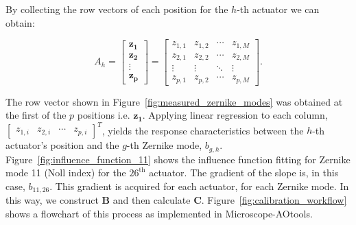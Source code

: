 By collecting the row vectors of each position
for the $h$-th actuator we can obtain:

\begin{equation}\label{eq:zernike_amp_actuator}
A_h = 
\begin{bmatrix}
\boldsymbol{z_{1}}\\
\boldsymbol{z_{2}}\\
\vdots\\
\boldsymbol{z_{p}} 
\end{bmatrix}
=
\begin{bmatrix}
z_{1,1} & z_{1,2} & \cdots & z_{1,M} \\
z_{2,1} & z_{2,2} & \cdots & z_{2,M} \\
\vdots  & \vdots  & \ddots & \vdots  \\
z_{p,1} & z_{p,2} & \cdots & z_{p,M} 
\end{bmatrix}.
\end{equation}

The row vector shown in Figure~\ref{fig:measured_zernike_modes} was 
obtained at the first of the $p$ positions i.e. $\boldsymbol{z_{1}}$. 
Applying linear regression to each column, $\begin{bmatrix} z_{1,i} & z_{2,i} 
& \cdots & z_{p,i} \end{bmatrix}^T$, yields the response characteristics 
between the $h$-th actuator's position and the $g$-th Zernike mode, 
$b_{g,h}$. Figure~\ref{fig:influence_function_11} shows the influence 
function fitting for Zernike mode 11 (Noll index) for the $26^{\text{th}}$ 
actuator. The gradient of the slope is, in this case, $b_{11,26}$. This 
gradient is acquired for each actuator, for each Zernike mode. In this way, 
we construct $\boldsymbol{B}$ and then calculate $\boldsymbol{C}$. 
Figure~\ref{fig:calibration_workflow} shows a flowchart of this process as 
implemented in Microscope-AOtools.

